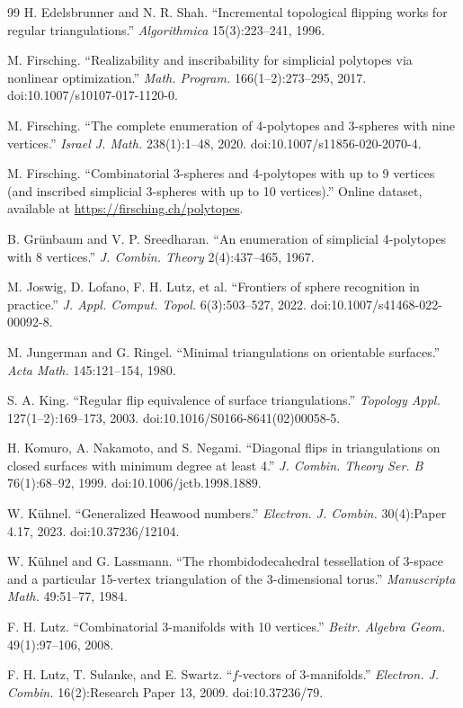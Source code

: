 \documentclass[11pt]{article}
\theoremstyle{remark}
\theoremstyle{plain}
\begin{document}
\begin{thebibliography}{99}
H. Edelsbrunner and N. R. Shah.
``Incremental topological flipping works for regular triangulations.''
\emph{Algorithmica} 15(3):223--241, 1996.

M. Firsching.
``Realizability and inscribability for simplicial polytopes via nonlinear
optimization.''
\emph{Math. Program.} 166(1--2):273--295, 2017.
doi:10.1007/s10107-017-1120-0.

M. Firsching.
``The complete enumeration of 4-polytopes and 3-spheres with nine vertices.''
\emph{Israel J. Math.} 238(1):1--48, 2020.
doi:10.1007/s11856-020-2070-4.

M. Firsching.
``Combinatorial 3-spheres and 4-polytopes with up to 9 vertices (and inscribed
simplicial 3-spheres with up to 10 vertices).''
Online dataset, available at \url{https://firsching.ch/polytopes}.

B. Gr\"unbaum and V. P. Sreedharan.
``An enumeration of simplicial 4-polytopes with 8 vertices.''
\emph{J. Combin. Theory} 2(4):437--465, 1967.

M. Joswig, D. Lofano, F. H. Lutz, et al.
``Frontiers of sphere recognition in practice.''
\emph{J. Appl. Comput. Topol.} 6(3):503--527, 2022.
doi:10.1007/s41468-022-00092-8.

M. Jungerman and G. Ringel.
``Minimal triangulations on orientable surfaces.''
\emph{Acta Math.} 145:121--154, 1980.

S. A. King.
``Regular flip equivalence of surface triangulations.''
\emph{Topology Appl.} 127(1--2):169--173, 2003.
doi:10.1016/S0166-8641(02)00058-5.

H. Komuro, A. Nakamoto, and S. Negami.
``Diagonal flips in triangulations on closed surfaces with minimum degree
at least 4.''
\emph{J. Combin. Theory Ser. B} 76(1):68--92, 1999.
doi:10.1006/jctb.1998.1889.

W. K\"uhnel.
``Generalized Heawood numbers.''
\emph{Electron. J. Combin.} 30(4):Paper 4.17, 2023.
doi:10.37236/12104.

W. K\"uhnel and G. Lassmann.
``The rhombidodecahedral tessellation of 3-space and a particular 15-vertex
triangulation of the 3-dimensional torus.''
\emph{Manuscripta Math.} 49:51--77, 1984.

F. H. Lutz.
``Combinatorial 3-manifolds with 10 vertices.''
\emph{Beitr. Algebra Geom.} 49(1):97--106, 2008.

F. H. Lutz, T. Sulanke, and E. Swartz.
``\(f\)-vectors of 3-manifolds.''
\emph{Electron. J. Combin.} 16(2):Research Paper 13, 2009.
doi:10.37236/79.


\end{thebibliography}
\end{document}
